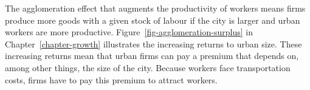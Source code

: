 The agglomeration effect that augments the productivity of workers means firms produce more goods with a given stock of labour if the city is larger and urban workers are more productive. Figure~\ref{fig-agglomeration-surplus} in Chapter~\ref{chapter-growth} illustrates the increasing returns to urban size. %
These increasing returns mean that urban firms can %
pay a premium that depends on, among other things,  the size of the city. Because workers face transportation costs, firms have to pay this premium to attract workers. %







